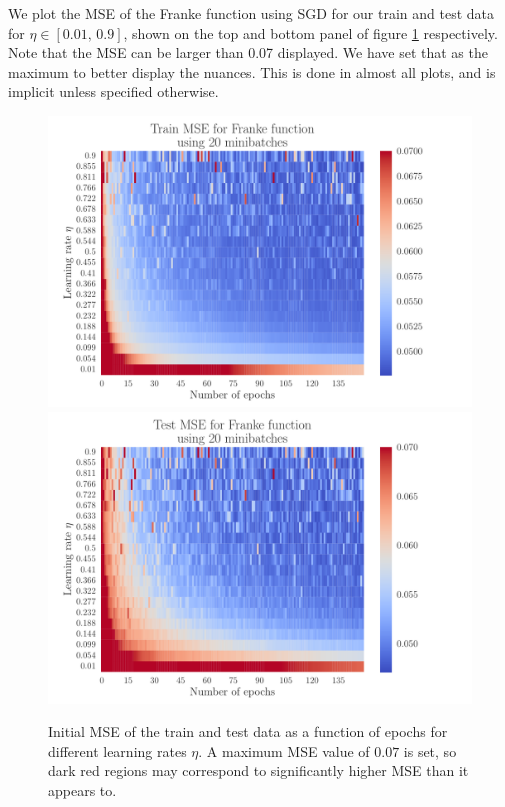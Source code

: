 \documentclass[12pt]{extarticle}
\begin{document}
We plot the MSE of the Franke function using SGD for our train and test data for $\eta\in[0.01,\,0.9]$, shown on the top and bottom panel of figure \ref{fig:SGD_Franke_epochs_eta_overfit} respectively. Note that the MSE can be larger than 0.07 displayed. We have set that as the maximum to better display the nuances. This is done in almost all plots, and is implicit unless specified otherwise.

\begin{figure}[h!]
	\includegraphics[width=\linewidth]{SGD_Franke/reg_Franke__epochs_eta__Train_MSE__overfit_489047.pdf}
	\includegraphics[width=\linewidth]{SGD_Franke/reg_Franke__epochs_eta__Test_MSE__overfit_395885.pdf}
	\caption{Initial MSE of the train and test data as a function of epochs for different learning rates $\eta$. A maximum MSE value of $0.07$ is set, so dark red regions may correspond to significantly higher MSE than it appears to.}
	\label{fig:SGD_Franke_epochs_eta_overfit}
\end{figure}
\end{document}
